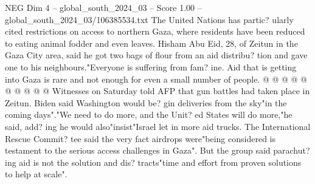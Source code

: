 \begin{textsample}{NEG Dim 4 – global\_south\_2024\_03 – Score 1.00 – global\_south\_2024\_03/106385534.txt}
The United Nations has partic? ularly cited restrictions on access to northern Gaza, where residents have been reduced to eating animal fodder and even leaves.
Hisham Abu Eid, 28, of Zeitun in the Gaza City area, said he got two bags of flour from an aid distribu? tion and gave one to his neighbours."Everyone is suffering from fam? ine.
Aid that is getting into Gaza is rare and not enough for even a small number of people. @ @ @ @ @ @ @ @ @ @ Witnesses on Saturday told AFP that gun battles had taken place in Zeitun.
Biden said Washington would be? gin deliveries from the sky"in the coming days"."We need to do more, and the Unit? ed States will do more,"he said, add? ing he would also"insist"Israel let in more aid trucks.
The International Rescue Commit? tee said the very fact airdrops were"being considered is testament to the serious access challenges in Gaza".
But the group said parachut? ing aid is not the solution and dis? tracts"time and effort from proven solutions to help at scale".

\end{textsample}
